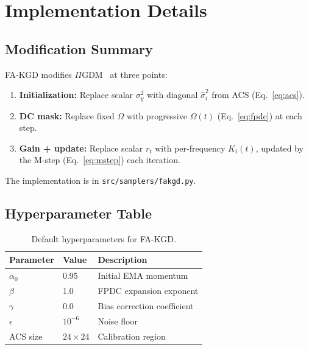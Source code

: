 \documentclass[conference]{IEEEtran}
\newcommand{\hatsig}{\hat{\sigma}}
\newcommand{\PIGDM}{$\Pi$GDM}
\begin{document}
\section{Implementation Details}
\label{app:impl}

\subsection{Modification Summary}

FA-KGD modifies \PIGDM{}~\cite{song2023pigdm} at three points:
\begin{enumerate}
  \item \textbf{Initialization:} Replace scalar $\sigma_y^2$ with diagonal
  $\hatsig_i^2$ from ACS (Eq.~\eqref{eq:acs}).
  \item \textbf{DC mask:} Replace fixed $\Omega$ with progressive $\Omega(t)$
  (Eq.~\eqref{eq:fpdc}) at each step.
  \item \textbf{Gain + update:} Replace scalar $r_t$ with per-frequency
  $K_i(t)$, updated by the M-step (Eq.~\eqref{eq:mstep}) each iteration.
\end{enumerate}
The implementation is in \texttt{src/samplers/fakgd.py}.

\subsection{Hyperparameter Table}

\begin{table}[h]
\centering
\caption{Default hyperparameters for FA-KGD.}
\label{tab:hparams}
\begin{tabular}{lll}
\toprule
\textbf{Parameter} & \textbf{Value} & \textbf{Description} \\
\midrule
$\alpha_0$ & 0.95 & Initial EMA momentum \\
$\beta$    & 1.0  & FPDC expansion exponent \\
$\gamma$   & 0.0  & Bias correction coefficient \\
$\epsilon$ & $10^{-6}$ & Noise floor \\
ACS size   & $24 \times 24$ & Calibration region \\
\bottomrule
\end{tabular}
\end{table}
\end{document}
